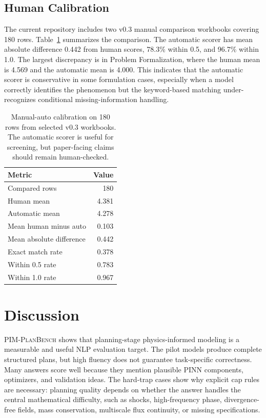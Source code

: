 \documentclass[11pt]{article}
\newcommand{\pimplanbench}{\textsc{PIM-PlanBench}}
\begin{document}
\subsection{Human Calibration}

The current repository includes two v0.3 manual comparison workbooks covering 180 rows. Table~\ref{tab:manual-auto} summarizes the comparison. The automatic scorer has mean absolute difference 0.442 from human scores, 78.3\% within 0.5, and 96.7\% within 1.0. The largest discrepancy is in Problem Formalization, where the human mean is 4.569 and the automatic mean is 4.000. This indicates that the automatic scorer is conservative in some formulation cases, especially when a model correctly identifies the phenomenon but the keyword-based matching under-recognizes conditional missing-information handling.

\begin{table}[t]
\caption{Manual-auto calibration on 180 rows from selected v0.3 workbooks. The automatic scorer is useful for screening, but paper-facing claims should remain human-checked.}
\label{tab:manual-auto}
\centering
\small
\begin{tabular}{lr}
\toprule
\textbf{Metric} & \textbf{Value} \\
\midrule
Compared rows & 180 \\
Human mean & 4.381 \\
Automatic mean & 4.278 \\
Mean human minus auto & 0.103 \\
Mean absolute difference & 0.442 \\
Exact match rate & 0.378 \\
Within 0.5 rate & 0.783 \\
Within 1.0 rate & 0.967 \\
\bottomrule
\end{tabular}
\end{table}

\section{Discussion}

\pimplanbench{} shows that planning-stage physics-informed modeling is a measurable and useful NLP evaluation target. The pilot models produce complete structured plans, but high fluency does not guarantee task-specific correctness. Many answers score well because they mention plausible PINN components, optimizers, and validation ideas. The hard-trap cases show why explicit cap rules are necessary: planning quality depends on whether the answer handles the central mathematical difficulty, such as shocks, high-frequency phase, divergence-free fields, mass conservation, multiscale flux continuity, or missing specifications.
\end{document}

